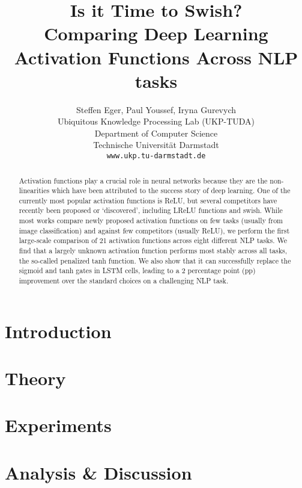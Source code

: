 \documentclass[11pt,a4paper]{article}
\title{Is it Time to Swish? \\ Comparing Deep Learning Activation Functions Across NLP tasks}
\author{Steffen Eger, Paul Youssef, Iryna Gurevych \\
  Ubiquitous Knowledge Processing Lab (UKP-TUDA) \\
  Department of Computer Science \\
  Technische Universit\"at Darmstadt\\
  {\tt www.ukp.tu-darmstadt.de} 
  }
\date{}
\newcommand{\swish}{\textsf{swish}}
\newcommand{\pentan}{\textsf{penalized tanh}}
\newcommand{\mytanh}{\textsf{tanh}}
\newcommand{\sigmoid}{\textsf{sigmoid}}
\begin{document}
\maketitle
\begin{abstract}
Activation functions play a crucial role in neural networks because they are the non-linearities which have been attributed to the success story of deep learning. One of the currently most popular activation functions is ReLU, but several competitors have recently been proposed or `discovered', including LReLU functions and \swish. While most works compare newly proposed activation functions on few tasks (usually from image classification) and against few competitors (usually ReLU), we perform the first large-scale comparison of 21 activation functions across eight different NLP tasks. We find that a largely unknown activation function performs most stably across all tasks, the so-called \pentan{} function. We also show that it can successfully replace the \sigmoid{} and \mytanh{} gates in LSTM cells, leading to a 2 percentage point (pp) improvement over the standard choices on a challenging NLP task. 
\end{abstract}

\section{Introduction}\label{sec:introduction}


\section{Theory}\label{sec:theory}


\section{Experiments}\label{sec:experiments}


\section{Analysis \& Discussion}\label{sec:analysis}



%
\end{document}
